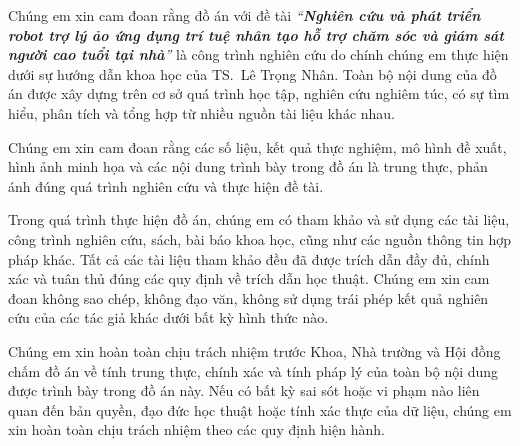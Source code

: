 Chúng em xin cam đoan rằng đồ án với đề tài 
\textit{``\textbf{Nghiên cứu và phát triển robot trợ lý ảo ứng dụng trí tuệ nhân tạo hỗ trợ chăm sóc và giám sát người cao tuổi tại nhà}''} 
là công trình nghiên cứu do chính chúng em thực hiện dưới sự hướng dẫn khoa học của TS.~Lê Trọng Nhân. 
Toàn bộ nội dung của đồ án được xây dựng trên cơ sở quá trình học tập, nghiên cứu nghiêm túc, có sự tìm hiểu, phân tích và tổng hợp từ nhiều nguồn tài liệu khác nhau.

Chúng em xin cam đoan rằng các số liệu, kết quả thực nghiệm, mô hình đề xuất, hình ảnh minh họa và các nội dung trình bày trong đồ án là trung thực, phản ánh đúng quá trình nghiên cứu và thực hiện đề tài.

Trong quá trình thực hiện đồ án, chúng em có tham khảo và sử dụng các tài liệu, công trình nghiên cứu, sách, bài báo khoa học, cũng như các nguồn thông tin hợp pháp khác. Tất cả các tài liệu tham khảo đều đã được trích dẫn đầy đủ, chính xác và tuân thủ đúng các quy định về trích dẫn học thuật. Chúng em xin cam đoan không sao chép, không đạo văn, không sử dụng trái phép kết quả nghiên cứu của các tác giả khác dưới bất kỳ hình thức nào.

Chúng em xin hoàn toàn chịu trách nhiệm trước Khoa, Nhà trường và Hội đồng chấm đồ án về tính trung thực, chính xác và tính pháp lý của toàn bộ nội dung được trình bày trong đồ án này. Nếu có bất kỳ sai sót hoặc vi phạm nào liên quan đến bản quyền, đạo đức học thuật hoặc tính xác thực của dữ liệu, chúng em xin hoàn toàn chịu trách nhiệm theo các quy định hiện hành.

\groupsignature
